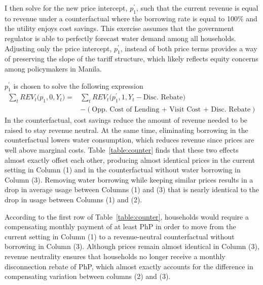 \documentclass[12pt]{article}
\begin{document}
I then solve for the new price intercept, $p^{\prime}_1$, such that the current revenue is equal to revenue under a counterfactual where the borrowing rate is equal to 100\% and the utility enjoys cost savings.   This exercise assumes that the government regulator is able to perfectly forecast water demand among all households.  Adjusting only the price intercept, $p^{\prime}_1$, instead of both price terms provides a way of preserving the slope of the tariff structure, which likely reflects equity concerns among policymakers in Manila.  

$p^{\prime}_1$ is chosen to solve the following expression
\begin{align*}
\sum_t REV_t \big(p_1,0,Y_t \big) =& \sum_t REV_t \big(p^{\prime}_1,1, Y_t - \text{Disc. Rebate} \big) \\
& - (\text{Opp. Cost of Lending + Visit Cost + Disc. Rebate})
\end{align*}
In the counterfactual, cost savings reduce the amount of revenue needed to be raised to stay revenue neutral.  At the same time, eliminating borrowing in the counterfactual lowers water consumption, which reduces revenue since prices are well above marginal costs.  Table~\ref{table:counter} finds that these two effects almost exactly offset each other, producing almost identical prices in the current setting in Column (1) and in the counterfactual without water borrowing in Column (3).  Removing water borrowing while keeping similar prices results in a drop in average usage between Columns (1) and (3) that is nearly identical to the drop in usage between Columns (1) and (2).

According to the first row of Table~\ref{table:counter}, households would require a compensating monthly payment of at least PhP in order to move from the current setting in  Column (1) to a revenue-neutral counterfactual without borrowing in Column (3).  Although prices remain almost identical in Column (3), revenue neutrality ensures that households no longer receive a monthly disconnection rebate of PhP, which almost exactly accounts for the difference in compensating variation between columns (2) and (3).  
\end{document}
